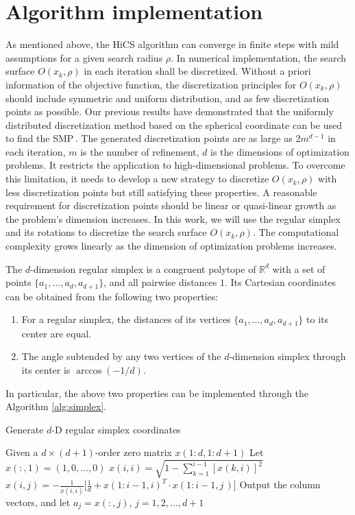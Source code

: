 \section{Algorithm implementation}
\label{sec:implement}

As mentioned above, the HiCS algorithm can converge in  
finite steps with mild assumptions for a given search radius $\rho$.
In numerical implementation, the search surface $O(x_k,\rho)$ in
each iteration shall be discretized.
Without a priori information of the objective function,
the discretization principles for $O(x_k,\rho)$
should include symmetric and uniform distribution, and as few
discretization points as possible.
Our previous results have demonstrated that the uniformly distributed
discretization method based on the spherical coordinate
can be used to find the SMP\,\cite{huang2017hill}. 
The generated discretization points are as large as $2m^{d-1}$ in
each iteration, $m$ is the number of refinement, $d$ is the dimensions of
optimization problems. It restricts the
application to high-dimensional problems. 
To overcome this limitation, it needs to develop a new
strategy to discretize $O(x_k,\rho)$ with less discretization points
but still satisfying these properties.
A reasonable requirement for discretization points should be
linear or quasi-linear growth as the problem's dimension increases.
In this work, we will use the regular simplex and its rotations to
discretize the search surface $O(x_k,\rho)$. 
The computational complexity grows linearly as the
dimension of optimization problems increases.

The $d$-dimension regular simplex is a congruent polytope of
$\mathbb{R}^d$ with a set of points $\{a_1,\dots,a_d,a_{d+1}\}$,
and all pairwise distances $1$.
Its Cartesian coordinates can be obtained from the following two properties:
\begin{enumerate}
	\item For a regular simplex, the distances of its vertices 
		$\{a_1,\dots,a_d,a_{d+1}\}$ to its center are equal.
	\item The angle subtended by any two vertices of the 
		$d$-dimension simplex through its center is
		$\arccos(-1/d)$.
\end{enumerate}
In particular, the above two properties can be implemented
through the Algorithm \ref{alg:simplex}.
\begin{algorithm}
	\caption{Generate $d$-D regular simplex coordinates} 
	\label{alg:simplex}
\begin{algorithmic}
	\STATE Given a $d\times(d+1)$-order zero matrix $x(1:d,1:d+1)$
	\STATE Let $x(:,1) = (1,0,\dots,0)$
	\STATE $x(i,i)=\sqrt{1-\sum_{k=1}^{i-1} [x(k, i)]^{2}}$
		\STATE $x(i,j)
		=-\frac{1}{x(i,i)}\Big[\frac{1}{d}+x(1:i-1, i)^T \cdot
		x(1:i-1, j\,)\Big]$
		\ENDFOR
	\ENDFOR
	\STATE Output the column vectors, and let $a_j=x(:,j)$,
	$j=1,2,\dots,d+1$ 
\end{algorithmic}
\end{algorithm}

